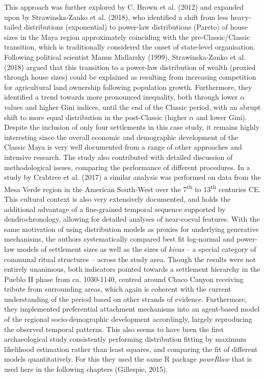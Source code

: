 \documentclass[
  12pt,
]{book}
\begin{document}
This approach was further explored by C. Brown et al. (2012) and expanded upon by Strawinska-Zanko et al. (2018), who identified a shift from less heavy-tailed distributions (exponential) to power-law distributions (Pareto) of house sizes in the Maya region approximately coinciding with the pre-Classic/Classic transition, which is traditionally considered the onset of state-level organisation. Following political scientist Manus Midlarsky (1999), Strawinska-Zanko et al. (2018) argued that this transition to a power-law distribution of wealth (proxied through house sizes) could be explained as resulting from increasing competition for agricultural land ownership following population growth. Furthermore, they identified a trend towards more pronounced inequality, both through lower \(\alpha\) values and higher Gini indices, until the end of the Classic period, with an abrupt shift to more equal distribution in the post-Classic (higher \(\alpha\) and lower Gini). Despite the inclusion of only four settlements in this case study, it remains highly interesting since the overall economic and demographic development of the Classic Maya is very well documented from a range of other approaches and intensive research. The study also contributed with detailed discussion of methodological issues, comparing the performance of different procedures. In a study by Crabtree et al. (2017) a similar analysis was performed on data from the Mesa Verde region in the American South-West over the 7\textsuperscript{th} to 13\textsuperscript{th} centuries CE. This cultural context is also very extensively documented, and holds the additional advantage of a fine-grained temporal sequence supported by dendrochronology, allowing for detailed analyses of near-coeval features. With the same motivation of using distribution models as proxies for underlying generative mechanisms, the authors systematically compared best fit log-normal and power-law models of settlement sizes as well as the sizes of \emph{kivas} -- a special category of communal ritual structures -- across the study area. Though the results were not entirely unanimous, both indicators pointed towards a settlement hierarchy in the Pueblo II phase from ca. 1030-1140, centred around Chaco Canyon receiving tribute from surrounding areas, which again is coherent with the current understanding of the period based on other strands of evidence. Furthermore, they implemented preferential attachment mechanisms into an agent-based model of the regional socio-demographic development accordingly, largely reproducing the observed temporal patterns. This also seems to have been the first archaeological study consistently performing distribution fitting by maximum likelihood estimation rather than least squares, and comparing the fit of different models quantitatively. For this they used the same R package \emph{poweRlaw} that is used here in the following chapters (Gillespie, 2015).
\end{document}
